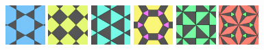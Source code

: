 \documentclass{beamer}
\begin{document}
\begin{frame}
  \includegraphics[width=0.6in]{hh01}
  \hspace{0.1mm}
  \includegraphics[width=0.6in]{hh02}
  \hspace{0.1mm}
  \includegraphics[width=0.6in]{hh03}
  \hspace{0.1mm}
  \includegraphics[width=0.6in]{hh04}
  \hspace{0.1mm}
  \includegraphics[width=0.6in]{hh05}
  \hspace{0.1mm}
  \includegraphics[width=0.6in]{hh06}\\[0.7mm]


\end{frame}
\end{document}
